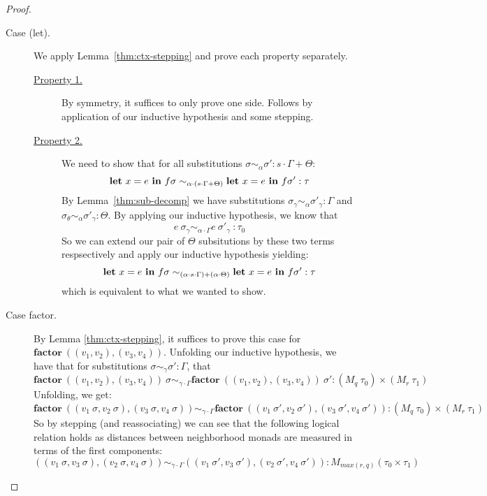 \begin{proof}
\begin{description}
    \item[Case (let).] 
      We apply Lemma~\ref{thm:ctx-stepping} and prove each property separately.
      \begin{description}
        \item[\underline{Property 1.}]
          By symmetry, it suffices to only prove one side. Follows by
          application of our inductive hypothesis and some stepping.
        \item[\underline{Property 2.}]
          We need to show that for all substitutions $\sigma \sim_{\alpha} \sigma' :
          s \cdot \Gamma + \Theta$:
          $$
          \textbf{let} \ x = e \ \textbf{in} \ f \sigma 
            \sim_{\alpha \cdot (s \cdot \Gamma + \Theta)}
          \textbf{let} \ x = e \ \textbf{in} \ f \sigma' :
          \tau
          $$
          By Lemma~\ref{thm:sub-decomp} we have substitutions $\sigma_{\gamma}
          \sim_\alpha \sigma'_{\gamma} : \Gamma$ and $\sigma_{\theta}
          \sim_\alpha \sigma'_{\gamma} : \Theta$. By applying our inductive
          hypothesis, we know that 
          $$
          e~\sigma_{\gamma} \sim_{\alpha \cdot \Gamma}
          e~\sigma'_{\gamma} \ : \tau_0
          $$
          So we can extend our pair of $\Theta$ subsitutions by these two terms
          respsectively and apply our inductive hypothesis yielding:
          $$
          \textbf{let} \ x = e \ \tin \ f \sigma 
            \sim_{(\alpha \cdot s \cdot \Gamma) + (\alpha \cdot \Theta)}
          \textbf{let} \ x = e \ \tin \ f \sigma' :
          \tau
          $$
          which is equivalent to what we wanted to show.

      \end{description}

    \item[Case factor.] 
      By Lemma \ref{thm:ctx-stepping}, it suffices to prove this case for 
      $\mathbf{factor}~((v_1, v_2), (v_3, v_4))$. 
      Unfolding our inductive hypothesis, we have that for substitutions
      $\sigma \sim_{\gamma} \sigma' : \Gamma$, that 
      $$\textbf{factor} \ ((v_1, v_2), (v_3, v_4))~\sigma 
      \sim_{\gamma \cdot \Gamma} 
      \textbf{factor} \ ((v_1, v_2), (v_3, v_4))~\sigma' : (M_q~\tau_0) \times (M_r~\tau_1)$$
      Unfolding, we get:
      $$
      \textbf{factor} \ ((v_1~\sigma, v_2~\sigma), (v_3~\sigma, v_4~\sigma)) 
      \sim_{\gamma \cdot \Gamma} 
      \textbf{factor} \ ((v_1~\sigma', v_2~\sigma'), (v_3~\sigma', v_4~\sigma')) : (M_q~\tau_0) \times (M_r~\tau_1)
      $$
      So by stepping (and reassociating) we can see that the following logical
      relation holds as distances between neighborhood monads are measured in
      terms of the first components:
      $$
      ((v_1~\sigma, v_3~\sigma), (v_2~\sigma, v_4~\sigma)) \sim_{\gamma \cdot \Gamma} ((v_1~\sigma', v_3~\sigma'),
      (v_2~\sigma', v_4~\sigma')) : M_{max(r,q)}(\tau_0 \times \tau_1)
      $$


\end{description}
\end{proof}

